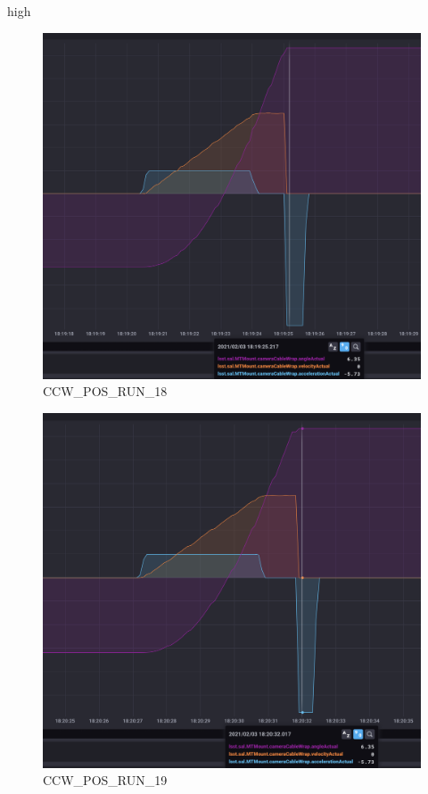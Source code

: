 high\documentclass[SE,lsstdraft,authoryear,toc]{lsstdoc}
\begin{document}
\begin{figure}[h!]
  \includegraphics[width=\linewidth]{media/CCW_design_speed_pos_test18.png}
  \caption{CCW\_POS\_RUN\_18}
  \label{fig:CCW_POS_RUN_18}
\end{figure}
\begin{figure}[h!]
  \includegraphics[width=\linewidth]{media/CCW_design_speed_pos_test19.png}
  \caption{CCW\_POS\_RUN\_19}
  \label{fig:CCW_POS_RUN_19}
\end{figure}
\end{document}
